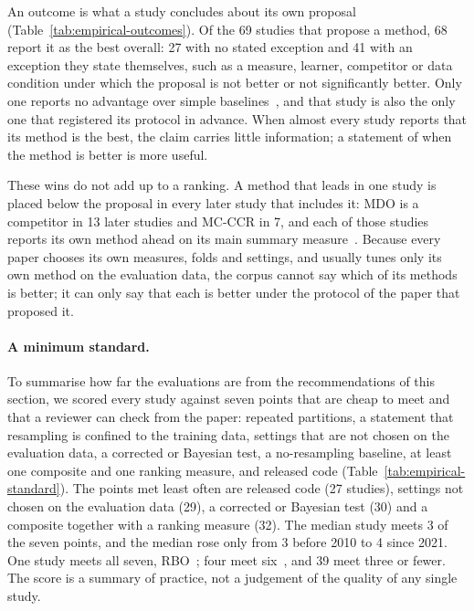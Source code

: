 An outcome is what a study concludes about its own proposal (Table~\ref{tab:empirical-outcomes}). Of the 69 studies that propose a method, 68 report it as the best overall: 27 with no stated exception and 41 with an exception they state themselves, such as a measure, learner, competitor or data condition under which the proposal is not better or not significantly better. Only one reports no advantage over simple baselines~\parencite{yadav2025ciso}, and that study is also the only one that registered its protocol in advance. When almost every study reports that its method is the best, the claim carries little information; a statement of when the method is better is more useful.



These wins do not add up to a ranking. A method that leads in one study is placed below the proposal in every later study that includes it: MDO is a competitor in 13 later studies and MC-CCR in 7, and each of those studies reports its own method ahead on its main summary measure~\parencite{naglik2024gmmsampling,yan2025gdhs,ma2024mcmbrc}. Because every paper chooses its own measures, folds and settings, and usually tunes only its own method on the evaluation data, the corpus cannot say which of its methods is better; it can only say that each is better under the protocol of the paper that proposed it.

\paragraph{A minimum standard.} To summarise how far the evaluations are from the recommendations of this section, we scored every study against seven points that are cheap to meet and that a reviewer can check from the paper: repeated partitions, a statement that resampling is confined to the training data, settings that are not chosen on the evaluation data, a corrected or Bayesian test, a no-resampling baseline, at least one composite and one ranking measure, and released code (Table~\ref{tab:empirical-standard}). The points met least often are released code (27 studies), settings not chosen on the evaluation data (29), a corrected or Bayesian test (30) and a composite together with a ranking measure (32). The median study meets 3 of the seven points, and the median rose only from 3 before 2010 to 4 since 2021. One study meets all seven, RBO~\parencite{koziarski2019rbo}; four meet six~\parencite{douzas2018kmeans,douzas2019gsmote,ren2025goio,ren2026dgot}, and 39 meet three or fewer. The score is a summary of practice, not a judgement of the quality of any single study.

